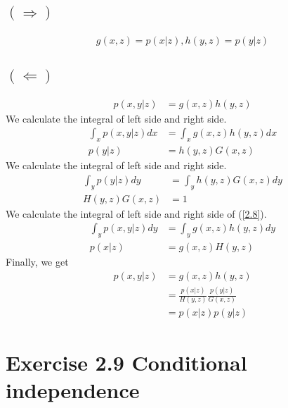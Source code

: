\documentclass{jsarticle}
\begin{document}
\subsection*{$(\Rightarrow)$}
\begin{align}
g(x,z)=p(x|z), h(y,z)=p(y|z)
\end{align}
\subsection*{$(\Leftarrow)$}
\begin{align}
p(x,y|z) & = g(x,z)h(y,z) \label{2.8}
\end{align}
We calculate the integral of left side and right side.
\begin{align}
\int_{x}p(x,y|z)dx & =\int_{x}g(x,z)h(y,z)dx\\
p(y|z) & = h(y,z)G(x,z) 
\end{align}
We calculate the integral of left side and right side.
\begin{align}
\int_{y}p(y|z)dy & =\int_{y}h(y,z)G(x,z)dy\\
H(y,z)G(x,z) & = 1
\end{align}
We calculate the integral of left side and right side of (\ref{2.8}).
\begin{align}
\int_{y}p(x,y|z)dy & = \int_{y}g(x,z)h(y,z)dy \\
p(x|z) & =g(x,z)H(y,z)
\end{align}
Finally, we get
\begin{align}
p(x,y|z) & = g(x,z)h(y,z)\\
& = \frac{p(x|z)}{H(y,z)}\frac{p(y|z)}{G(x,z)} \\
& = p(x|z)p(y|z)
\end{align}

\section*{Exercise 2.9 Conditional independence}
\end{document}
